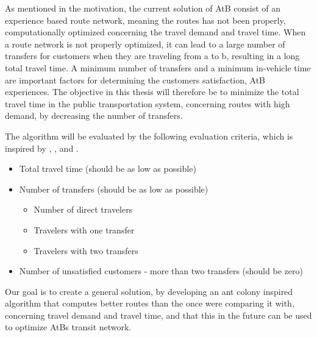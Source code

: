 As mentioned in the motivation, %
the current solution of AtB \citep{website:atb} consist of an experience based route network, meaning the routes has not been properly, computationally optimized concerning the travel demand and travel time. When a route network is not properly optimized, it can lead to a large number of transfers for customers when they are traveling from a to b, resulting in a long total travel time. A minimum number of transfers and a minimum in-vehicle time are important factors for determining the customers satisfaction, AtB experiences. The objective in this thesis will therefore be to minimize the total travel time in the public transportation system, concerning routes with high demand, by decreasing the number of transfers. %

The algorithm will be evaluated by the following evaluation criteria, which is inspired by \citep{kechagiopoulos14}, \citep{mandl80}, \citep{nikolic14} and \citep{fan09}.
\begin{itemize}
\item Total travel time (should be as low as possible)
\item Number of transfers (should be as low as possible)
\begin{itemize}
\item Number of direct travelers 
\item Travelers with one transfer
\item Travelers with two transfers
\end{itemize}
\item Number of unsatisfied customers - more than two transfers (should be zero)
\end{itemize}

Our goal is to create a general solution, by developing an ant colony inspired algorithm that computes better routes than the once were comparing it with, concerning travel demand and travel time, and that this in the future can be used to optimize AtBs transit network. %

